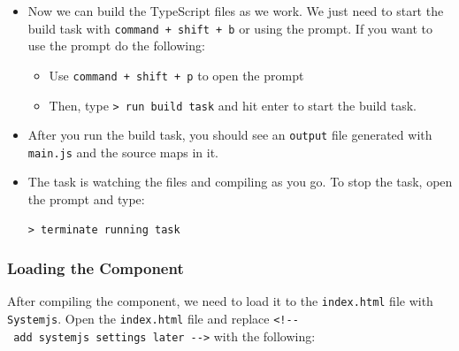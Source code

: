 \documentclass[12pt,]{article}
\newenvironment{Shaded}{}{}
\newcommand{\KeywordTok}[1]{\textcolor[rgb]{0.00,0.00,1.00}{{#1}}}
\newcommand{\DataTypeTok}[1]{{#1}}
\newcommand{\StringTok}[1]{\textcolor[rgb]{0.00,0.50,0.50}{{#1}}}
\newcommand{\FunctionTok}[1]{{#1}}
\begin{document}
\begin{Shaded}
\end{Shaded}

\begin{itemize}
\item
  Now we can build the TypeScript files as we work. We just need to
  start the build task with \texttt{command\ +\ shift\ +\ b} or using
  the prompt. If you want to use the prompt do the following:

  \begin{itemize}
  \item
    Use \texttt{command\ +\ shift\ +\ p} to open the prompt
  \item
    Then, type \texttt{\textgreater{}\ run\ build\ task} and hit enter
    to start the build task.
  \end{itemize}
\item
  After you run the build task, you should see an \texttt{output} file
  generated with \texttt{main.js} and the source maps in it.
\item
  The task is watching the files and compiling as you go. To stop the
  task, open the prompt and type:

\begin{verbatim}
> terminate running task
\end{verbatim}
\end{itemize}

\subsubsection{Loading the Component}\label{loading-the-component}

After compiling the component, we need to load it to the
\texttt{index.html} file with \texttt{Systemjs}. Open the
\texttt{index.html} file and replace
\texttt{\textless{}!-\/-\ add\ systemjs\ settings\ later\ -\/-\textgreater{}}
with the following:
\end{document}
